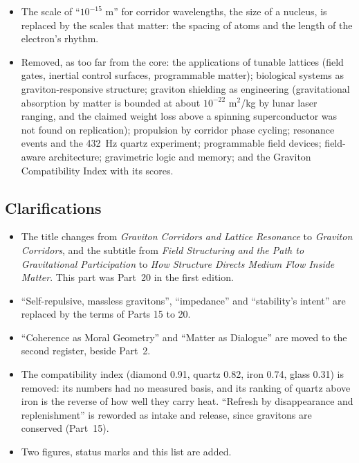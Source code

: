 \documentclass[11pt,a4paper]{article}
\begin{document}
\begin{itemize}
\item The scale of ``$10^{-15}$ m'' for corridor wavelengths, the size of a nucleus, is replaced by the scales that matter: the spacing of atoms and the length of the electron's rhythm.
\item Removed, as too far from the core: the applications of tunable lattices (field gates, inertial control surfaces, programmable matter); biological systems as graviton-responsive structure; graviton shielding as engineering (gravitational absorption by matter is bounded at about $10^{-22}$ m$^2$/kg by lunar laser ranging, and the claimed weight loss above a spinning superconductor was not found on replication); propulsion by corridor phase cycling; resonance events and the 432~Hz quartz experiment; programmable field devices; field-aware architecture; gravimetric logic and memory; and the Graviton Compatibility Index with its scores.
\end{itemize}

\subsection*{Clarifications}
\begin{itemize}
\item The title changes from \emph{Graviton Corridors and Lattice Resonance} to \emph{Graviton Corridors}, and the subtitle from \emph{Field Structuring and the Path to Gravitational Participation} to \emph{How Structure Directs Medium Flow Inside Matter}. This part was Part~20 in the first edition.
\item ``Self-repulsive, massless gravitons'', ``impedance'' and ``stability's intent'' are replaced by the terms of Parts 15 to 20.
\item ``Coherence as Moral Geometry'' and ``Matter as Dialogue'' are moved to the second register, beside Part~2.
\item The compatibility index (diamond 0.91, quartz 0.82, iron 0.74, glass 0.31) is removed: its numbers had no measured basis, and its ranking of quartz above iron is the reverse of how well they carry heat. ``Refresh by disappearance and replenishment'' is reworded as intake and release, since gravitons are conserved (Part~15).
\item Two figures, status marks and this list are added.
\end{itemize}

\newpage


\end{document}
